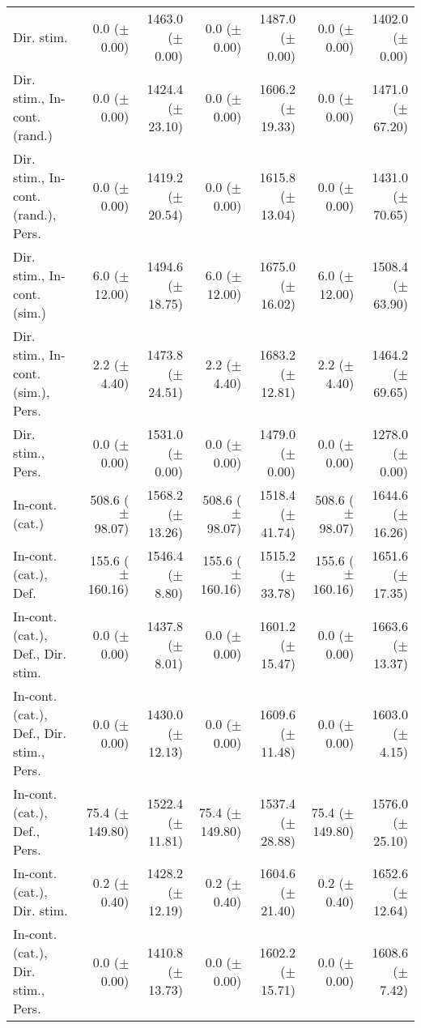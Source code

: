 \begin{table*}
\begin{tabular}{lrrrrrr}
        Dir. stim. & 0.0 ($\pm$ 0.00) & 1463.0 ($\pm$ 0.00) & 0.0 ($\pm$ 0.00) & 1487.0 ($\pm$ 0.00) & 0.0 ($\pm$ 0.00) & 1402.0 ($\pm$ 0.00) \\
        Dir. stim., In-cont. (rand.) & 0.0 ($\pm$ 0.00) & 1424.4 ($\pm$ 23.10) & 0.0 ($\pm$ 0.00) & 1606.2 ($\pm$ 19.33) & 0.0 ($\pm$ 0.00) & 1471.0 ($\pm$ 67.20) \\
        Dir. stim., In-cont. (rand.), Pers. & 0.0 ($\pm$ 0.00) & 1419.2 ($\pm$ 20.54) & 0.0 ($\pm$ 0.00) & 1615.8 ($\pm$ 13.04) & 0.0 ($\pm$ 0.00) & 1431.0 ($\pm$ 70.65) \\
        Dir. stim., In-cont. (sim.) & 6.0 ($\pm$ 12.00) & 1494.6 ($\pm$ 18.75) & 6.0 ($\pm$ 12.00) & 1675.0 ($\pm$ 16.02) & 6.0 ($\pm$ 12.00) & 1508.4 ($\pm$ 63.90) \\
        Dir. stim., In-cont. (sim.), Pers. & 2.2 ($\pm$ 4.40) & 1473.8 ($\pm$ 24.51) & 2.2 ($\pm$ 4.40) & 1683.2 ($\pm$ 12.81) & 2.2 ($\pm$ 4.40) & 1464.2 ($\pm$ 69.65) \\
        Dir. stim., Pers. & 0.0 ($\pm$ 0.00) & 1531.0 ($\pm$ 0.00) & 0.0 ($\pm$ 0.00) & 1479.0 ($\pm$ 0.00) & 0.0 ($\pm$ 0.00) & 1278.0 ($\pm$ 0.00) \\
        In-cont. (cat.) & 508.6 ($\pm$ 98.07) & 1568.2 ($\pm$ 13.26) & 508.6 ($\pm$ 98.07) & 1518.4 ($\pm$ 41.74) & 508.6 ($\pm$ 98.07) & 1644.6 ($\pm$ 16.26) \\
        In-cont. (cat.), Def. & 155.6 ($\pm$ 160.16) & 1546.4 ($\pm$ 8.80) & 155.6 ($\pm$ 160.16) & 1515.2 ($\pm$ 33.78) & 155.6 ($\pm$ 160.16) & 1651.6 ($\pm$ 17.35) \\
        In-cont. (cat.), Def., Dir. stim. & 0.0 ($\pm$ 0.00) & 1437.8 ($\pm$ 8.01) & 0.0 ($\pm$ 0.00) & 1601.2 ($\pm$ 15.47) & 0.0 ($\pm$ 0.00) & 1663.6 ($\pm$ 13.37) \\
        In-cont. (cat.), Def., Dir. stim., Pers. & 0.0 ($\pm$ 0.00) & 1430.0 ($\pm$ 12.13) & 0.0 ($\pm$ 0.00) & 1609.6 ($\pm$ 11.48) & 0.0 ($\pm$ 0.00) & 1603.0 ($\pm$ 4.15) \\
        In-cont. (cat.), Def., Pers. & 75.4 ($\pm$ 149.80) & 1522.4 ($\pm$ 11.81) & 75.4 ($\pm$ 149.80) & 1537.4 ($\pm$ 28.88) & 75.4 ($\pm$ 149.80) & 1576.0 ($\pm$ 25.10) \\
        In-cont. (cat.), Dir. stim. & 0.2 ($\pm$ 0.40) & 1428.2 ($\pm$ 12.19) & 0.2 ($\pm$ 0.40) & 1604.6 ($\pm$ 21.40) & 0.2 ($\pm$ 0.40) & 1652.6 ($\pm$ 12.64) \\
        In-cont. (cat.), Dir. stim., Pers. & 0.0 ($\pm$ 0.00) & 1410.8 ($\pm$ 13.73) & 0.0 ($\pm$ 0.00) & 1602.2 ($\pm$ 15.71) & 0.0 ($\pm$ 0.00) & 1608.6 ($\pm$ 7.42) \\

\end{tabular}
\end{table*}
